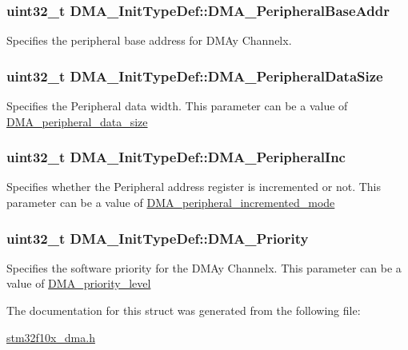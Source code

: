 \hypertarget{structDMA__InitTypeDef_a232af556de7c2eec9a82d448730bd86d}{
\subsubsection[{DMA\_\-PeripheralBaseAddr}]{\setlength{\rightskip}{0pt plus 5cm}uint32\_\-t {\bf DMA\_\-InitTypeDef::DMA\_\-PeripheralBaseAddr}}}
\label{structDMA__InitTypeDef_a232af556de7c2eec9a82d448730bd86d}
Specifies the peripheral base address for DMAy Channelx. \hypertarget{structDMA__InitTypeDef_afb46aaadfb80a7e19277c868bd252554}{
\subsubsection[{DMA\_\-PeripheralDataSize}]{\setlength{\rightskip}{0pt plus 5cm}uint32\_\-t {\bf DMA\_\-InitTypeDef::DMA\_\-PeripheralDataSize}}}
\label{structDMA__InitTypeDef_afb46aaadfb80a7e19277c868bd252554}
Specifies the Peripheral data width. This parameter can be a value of \hyperlink{group__DMA__peripheral__data__size}{DMA\_\-peripheral\_\-data\_\-size} \hypertarget{structDMA__InitTypeDef_ad4d427790f9a089ca0257a358fc263c2}{
\subsubsection[{DMA\_\-PeripheralInc}]{\setlength{\rightskip}{0pt plus 5cm}uint32\_\-t {\bf DMA\_\-InitTypeDef::DMA\_\-PeripheralInc}}}
\label{structDMA__InitTypeDef_ad4d427790f9a089ca0257a358fc263c2}
Specifies whether the Peripheral address register is incremented or not. This parameter can be a value of \hyperlink{group__DMA__peripheral__incremented__mode}{DMA\_\-peripheral\_\-incremented\_\-mode} \hypertarget{structDMA__InitTypeDef_ab9a17bd51778478cbd728c868206dca0}{
\subsubsection[{DMA\_\-Priority}]{\setlength{\rightskip}{0pt plus 5cm}uint32\_\-t {\bf DMA\_\-InitTypeDef::DMA\_\-Priority}}}
\label{structDMA__InitTypeDef_ab9a17bd51778478cbd728c868206dca0}
Specifies the software priority for the DMAy Channelx. This parameter can be a value of \hyperlink{group__DMA__priority__level}{DMA\_\-priority\_\-level} 

The documentation for this struct was generated from the following file:\begin{DoxyCompactItemize}
\item 
\hyperlink{stm32f10x__dma_8h}{stm32f10x\_\-dma.h}\end{DoxyCompactItemize}
